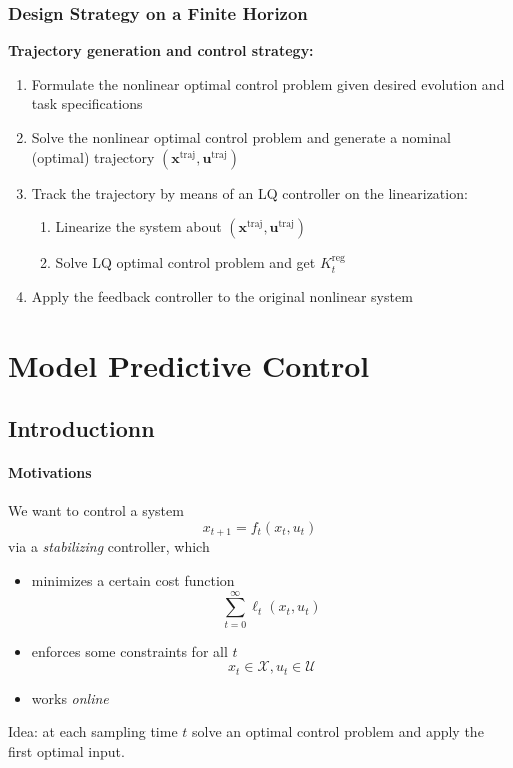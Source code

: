 \documentclass[openany]{book}
\theoremstyle{definition}
\theoremstyle{remark}
\begin{document}
\subsection{Design Strategy on a Finite Horizon}
\textbf{Trajectory generation and control strategy:}
\begin{enumerate}
    \item Formulate the nonlinear optimal control problem given desired evolution and task specifications
    \item Solve the nonlinear optimal control problem and generate a nominal (optimal) trajectory $(\mathbf{x}^{\text{traj}}, \mathbf{u}^{\text{traj}})$
    \item Track the trajectory by means of an LQ controller on the linearization:
        \begin{enumerate}
            \item Linearize the system about $(\mathbf{x}^{\text{traj}}, \mathbf{u}^{\text{traj}})$
            \item Solve LQ optimal control problem and get $K_t^{\text{reg}}$
        \end{enumerate}
    \item Apply the feedback controller to the original nonlinear system
\end{enumerate}


\chapter{Model Predictive Control}
\section{Introductionn}
\subsubsection{Motivations}
We want to control a system 
\[
    x_{t+1} = f_t(x_t,u_t)
\]
via a \emph{stabilizing} controller, which
\begin{itemize}
    \item minimizes a certain cost function \[
            \displaystyle\sum_{t=0}^{\infty}\ell_t(x_t,u_t)
        \]
    \item enforces some constraints for all $t$ 
        \[
            x_t \in \mathcal{X}, u_t \in \mathcal{U}
        \]
    \item works \emph{online}
\end{itemize}
Idea: at each sampling time $t$ solve an optimal control problem and apply the first optimal input.
\end{document}
